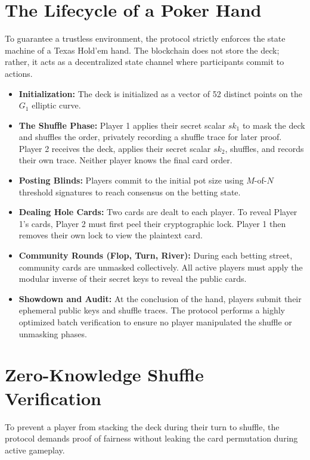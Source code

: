 \documentclass[11pt, a4paper]{article}
\begin{document}
\section{The Lifecycle of a Poker Hand}
To guarantee a trustless environment, the protocol strictly enforces the state machine of a Texas Hold'em hand. The blockchain does not store the deck; rather, it acts as a decentralized state channel where participants commit to actions.

\begin{itemize}
    \item \textbf{Initialization:} The deck is initialized as a vector of 52 distinct points on the $G_1$ elliptic curve.
    \item \textbf{The Shuffle Phase:} Player 1 applies their secret scalar $sk_1$ to mask the deck and shuffles the order, privately recording a shuffle trace for later proof. Player 2 receives the deck, applies their secret scalar $sk_2$, shuffles, and records their own trace. Neither player knows the final card order.
    \item \textbf{Posting Blinds:} Players commit to the initial pot size using $M$-of-$N$ threshold signatures to reach consensus on the betting state.
    \item \textbf{Dealing Hole Cards:} Two cards are dealt to each player. To reveal Player 1's cards, Player 2 must first peel their cryptographic lock. Player 1 then removes their own lock to view the plaintext card.
    \item \textbf{Community Rounds (Flop, Turn, River):} During each betting street, community cards are unmasked collectively. All active players must apply the modular inverse of their secret keys to reveal the public cards.
    \item \textbf{Showdown and Audit:} At the conclusion of the hand, players submit their ephemeral public keys and shuffle traces. The protocol performs a highly optimized batch verification to ensure no player manipulated the shuffle or unmasking phases.
\end{itemize}

\section{Zero-Knowledge Shuffle Verification}
To prevent a player from stacking the deck during their turn to shuffle, the protocol demands proof of fairness without leaking the card permutation during active gameplay.
\end{document}
